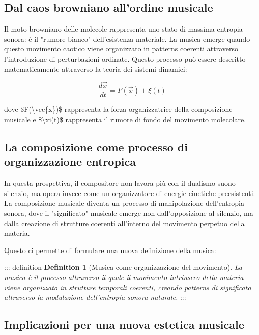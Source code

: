 \documentclass[a4paper,11pt]{article}
\begin{document}
\subsection{Dal caos browniano all'ordine musicale}\hypertarget{dal-caos-browniano-allordine-musicale}{}\label{dal-caos-browniano-allordine-musicale}

Il moto browniano delle molecole rappresenta uno stato di massima
entropia sonora: è il "rumore bianco" dell'esistenza materiale. La
musica emerge quando questo movimento caotico viene organizzato in
patterns coerenti attraverso l'introduzione di perturbazioni ordinate.
Questo processo può essere descritto matematicamente attraverso la
teoria dei sistemi dinamici:

\begin{displaymath}
\frac{d\vec{x}}{dt} = F(\vec{x}) + \xi(t)
\end{displaymath}

dove \$F(\textbackslash{}vec\{x\})\$ rappresenta la forza organizzatrice della composizione
musicale e \$\textbackslash{}xi(t)\$ rappresenta il rumore di fondo del movimento
molecolare.

\subsection{La composizione come processo di organizzazione entropica}\hypertarget{la-composizione-come-processo-di-organizzazione-entropica}{}\label{la-composizione-come-processo-di-organizzazione-entropica}

In questa prospettiva, il compositore non lavora più con il dualismo
suono-silenzio, ma opera invece come un organizzatore di energie
cinetiche preesistenti. La composizione musicale diventa un processo di
manipolazione dell'entropia sonora, dove il "significato" musicale
emerge non dall'opposizione al silenzio, ma dalla creazione di strutture
coerenti all'interno del movimento perpetuo della materia.

Questo ci permette di formulare una nuova definizione della musica:

::: definition
\textbf{Definition 1} (Musica come organizzazione del movimento). \emph{La musica
è il processo attraverso il quale il movimento intrinseco della materia
viene organizzato in strutture temporali coerenti, creando patterns di
significato attraverso la modulazione dell'entropia sonora naturale.}
:::

\subsection{Implicazioni per una nuova estetica musicale}\hypertarget{implicazioni-per-una-nuova-estetica-musicale}{}\label{implicazioni-per-una-nuova-estetica-musicale}
\end{document}
